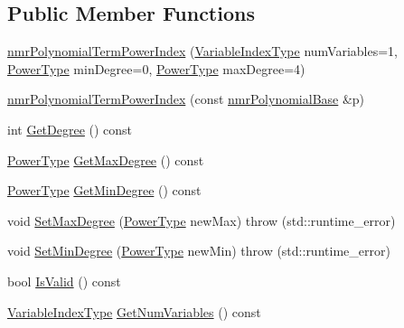 \subsection*{Public Member Functions}
\begin{DoxyCompactItemize}
\item 
\hyperlink{classnmr_polynomial_term_power_index_a228f57fb006939574201fda8ca3237c3}{nmr\+Polynomial\+Term\+Power\+Index} (\hyperlink{classnmr_polynomial_term_power_index_ac982d5f82c3a95968e92d54c92cbc3e0}{Variable\+Index\+Type} num\+Variables=1, \hyperlink{classnmr_polynomial_term_power_index_a2eec01c3a2c3f56f47982ceffd8e36ed}{Power\+Type} min\+Degree=0, \hyperlink{classnmr_polynomial_term_power_index_a2eec01c3a2c3f56f47982ceffd8e36ed}{Power\+Type} max\+Degree=4)
\item 
\hyperlink{classnmr_polynomial_term_power_index_aa4a8ecd01e40b76a4fd20d58773ac375}{nmr\+Polynomial\+Term\+Power\+Index} (const \hyperlink{classnmr_polynomial_base}{nmr\+Polynomial\+Base} \&p)
\item 
int \hyperlink{classnmr_polynomial_term_power_index_ad74e09241ad425d80c7c4ccbe9e8d7dd}{Get\+Degree} () const 
\item 
\hyperlink{classnmr_polynomial_term_power_index_a2eec01c3a2c3f56f47982ceffd8e36ed}{Power\+Type} \hyperlink{classnmr_polynomial_term_power_index_ad8e4cb46dab70a93b56c4ce42f9eded1}{Get\+Max\+Degree} () const 
\item 
\hyperlink{classnmr_polynomial_term_power_index_a2eec01c3a2c3f56f47982ceffd8e36ed}{Power\+Type} \hyperlink{classnmr_polynomial_term_power_index_a0474a1274dbedfe5ff5b4830f4e6c47f}{Get\+Min\+Degree} () const 
\item 
void \hyperlink{classnmr_polynomial_term_power_index_a7258a386411761862e9ab455cc107e23}{Set\+Max\+Degree} (\hyperlink{classnmr_polynomial_term_power_index_a2eec01c3a2c3f56f47982ceffd8e36ed}{Power\+Type} new\+Max)  throw (std\+::runtime\+\_\+error)
\item 
void \hyperlink{classnmr_polynomial_term_power_index_a484a45cda96657835b5137b18c13ae0b}{Set\+Min\+Degree} (\hyperlink{classnmr_polynomial_term_power_index_a2eec01c3a2c3f56f47982ceffd8e36ed}{Power\+Type} new\+Min)  throw (std\+::runtime\+\_\+error)
\item 
bool \hyperlink{classnmr_polynomial_term_power_index_afe6a8231affbcb38890f7e33cabdb59c}{Is\+Valid} () const 
\item 
\hyperlink{classnmr_polynomial_term_power_index_ac982d5f82c3a95968e92d54c92cbc3e0}{Variable\+Index\+Type} \hyperlink{classnmr_polynomial_term_power_index_a7b3cc89f51a30def066491115af27737}{Get\+Num\+Variables} () const 

\end{DoxyCompactItemize}
